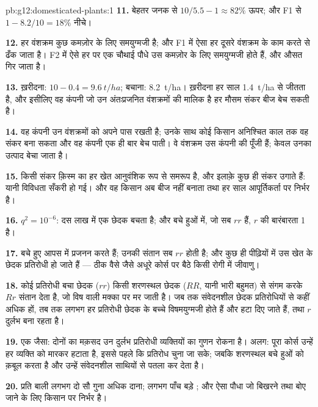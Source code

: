\begin{solution}{pb:g12:domesticated-plants:1}
\textbf{11.} बेहतर जनक से $10/5.5 - 1 \approx 82\%$ ऊपर; और F1 से
$1 - 8.2/10 = 18\%$ नीचे।

\textbf{12.} हर वंशक्रम कुछ कमज़ोर   के लिए
समयुग्मजी है; और F1 में ऐसा हर  दूसरे वंशक्रम के काम करते
 से ढँक जाता है। F2 में ऐसे हर  पर एक चौथाई पौधे उस कमज़ोर
 के लिए समयुग्मजी होते हैं, और औसत गिर जाता है।

\textbf{13.} ख़रीदना: $10 - 0.4 = \qty{9.6}{t/ha}$; बचाना: \qty{8.2}{t/ha}।
ख़रीदना हर साल \qty{1.4}{t/ha} से जीतता है, और इसीलिए वह कंपनी जो उन
अंतःप्रजनित वंशक्रमों की मालिक है हर मौसम संकर बीज बेच सकती है।

\textbf{14.} वह कंपनी उन वंशक्रमों को अपने पास रखती है; उनके साथ कोई किसान
अनिश्चित काल तक वह संकर बना सकता और वह कंपनी एक ही बार बेच पाती। वे वंशक्रम
उस कंपनी की पूँजी हैं; केवल उनका उत्पाद बेचा जाता है।

\textbf{15.} किसी संकर क़िस्म का हर खेत आनुवंशिक रूप से समरूप है, और इलाक़े
कुछ ही संकर उगाते हैं: यानी विविधता सँकरी हो गई। और वह किसान अब बीज नहीं
बनाता तथा हर साल आपूर्तिकर्ता पर निर्भर है।

\textbf{16.} $q^2 = 10^{-6}$: दस लाख में एक छेदक बचता है; और बचे हुओं में,
जो सब $rr$ हैं, $r$ की बारंबारता 1 है।

\textbf{17.} बचे हुए आपस में प्रजनन करते हैं; उनकी संतान सब $rr$ होती है;
और कुछ ही पीढ़ियों में उस खेत के छेदक प्रतिरोधी हो जाते हैं --- ठीक वैसे
जैसे अधूरे कोर्स पर बैठे किसी रोगी में जीवाणु।

\textbf{18.} कोई प्रतिरोधी बचा छेदक ($rr$) किसी शरणस्थल छेदक ($RR$, यानी
भारी बहुमत) से संगम करके $Rr$ संतान देता है, जो विष वाली मक्का पर मर जाती
है। जब तक संवेदनशील छेदक प्रतिरोधियों से कहीं अधिक हों, तब तक लगभग हर
प्रतिरोधी छेदक के बच्चे विषमयुग्मजी होते हैं और हटा दिए जाते हैं, तथा $r$
दुर्लभ बना रहता है।

\textbf{19.} एक जैसा: दोनों का मक़सद उन दुर्लभ प्रतिरोधी व्यक्तियों का गुणन
रोकना है। अलग: पूरा कोर्स उन्हें हर व्यक्ति को मारकर हटाता है, इससे पहले कि
प्रतिरोध चुना जा सके; जबकि शरणस्थल बचे हुओं को क़बूल करता है और उन्हें
संवेदनशील साथियों से पतला कर देता है।

\textbf{20.} प्रति बाली लगभग दो सौ गुना अधिक दाना; लगभग पाँच बड़े ; और
ऐसा पौधा जो बिखरने तथा बोए जाने के लिए किसान पर निर्भर है।
\end{solution}

